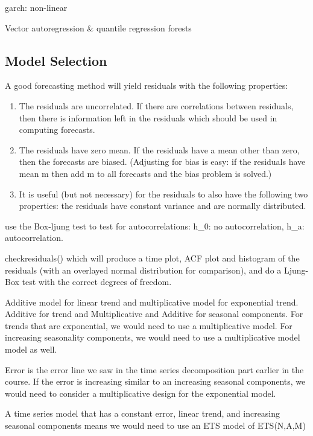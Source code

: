 \documentclass[]{book}
\begin{document}
garch: non-linear

Vector autoregression \& quantile regression forests

\subsection{Model Selection}\label{model-selection}

A good forecasting method will yield residuals with the following
properties:

\begin{enumerate}
\def\labelenumi{\arabic{enumi})}
\item
  The residuals are uncorrelated. If there are correlations between
  residuals, then there is information left in the residuals which
  should be used in computing forecasts.
\item
  The residuals have zero mean. If the residuals have a mean other than
  zero, then the forecasts are biased. (Adjusting for bias is easy: if
  the residuals have mean m then add m to all forecasts and the bias
  problem is solved.)
\item
  It is useful (but not necessary) for the residuals to also have the
  following two properties: the residuals have constant variance and are
  normally distributed.
\end{enumerate}

use the Box-ljung test to test for autocorrelations: h\_0: no
autocorrelation, h\_a: autocorrelation.

checkresiduals() which will produce a time plot, ACF plot and histogram
of the residuals (with an overlayed normal distribution for comparison),
and do a Ljung-Box test with the correct degrees of freedom.

Additive model for linear trend and multiplicative model for exponential
trend. Additive for trend and Multiplicative and Additive for seasonal
components. For trends that are exponential, we would need to use a
multiplicative model. For increasing seasonality components, we would
need to use a multiplicative model model as well.

Error is the error line we saw in the time series decomposition part
earlier in the course. If the error is increasing similar to an
increasing seasonal components, we would need to consider a
multiplicative design for the exponential model.

A time series model that has a constant error, linear trend, and
increasing seasonal components means we would need to use an ETS model
of ETS(N,A,M)
\end{document}
